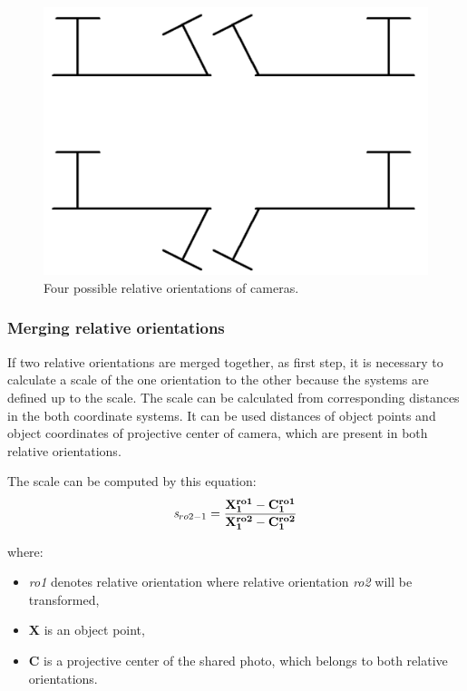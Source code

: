 \documentclass[a4paper,12pt]{article}
\newcommand{\evect}[1]{
{\bf #1}
}
\newcommand{\escal}[1]{
{\it #1}
}
\newcommand{\term}[1]{
{\it #1}
}
\begin{document}
\begin{figure}[h]
    \centering
    \includegraphics[scale=0.3]{figures/eo_ambiguity.png}
    \caption{Four possible relative orientations of cameras.}
    \label{fig:rel_or_amb}
\end{figure}


\subsubsection{Merging relative orientations}
\label{sec:ess_chain}


If two relative orientations are merged together, as first step, it is necessary to calculate a scale of the one orientation
to the other because the systems are defined up to the scale.
The scale can be calculated from corresponding distances in the both coordinate systems. 
It can be used distances of 
object points and object coordinates of projective center of camera, which are present in both relative orientations.

The scale can be computed by this equation:
\begin{equation}
\escal{s}_{ro2-1} = \frac{\mathbf{\evect{X}^{ro1}_{1} - \evect{C^{ro1}_{1}}}}
	                {\mathbf{\evect{X}^{ro2}_{1} - \evect{C^{ro2}_{1}}}}
\end{equation}

where:
\begin{itemize}
\item \term{ro1} denotes relative orientation where relative  orientation \term{ro2} will be transformed,
\item \evect{X} is an object point,
\item \evect{C} is a projective center of the shared photo, which belongs to both relative orientations.
\end{itemize}
\end{document}
